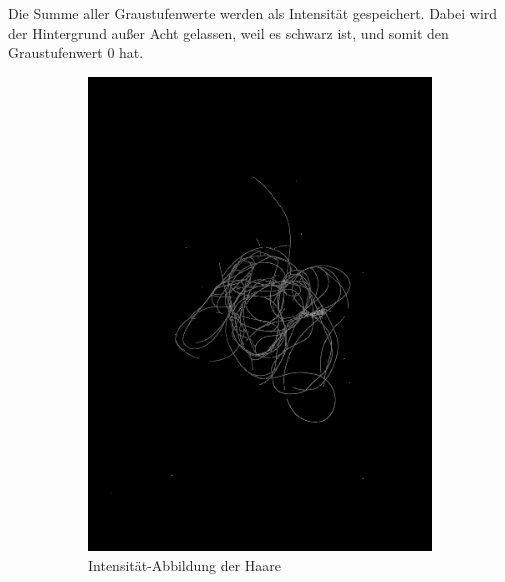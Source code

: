 \documentclass[german,a4paper, 12pt]{llncs}
\begin{document}
Die Summe aller Graustufenwerte werden als Intensität gespeichert. Dabei wird der Hintergrund außer Acht gelassen, weil es schwarz ist, und somit den Graustufenwert 0 hat.
\begin{figure}
	\centering
	\begin{subfigure}[b]{0.475\textwidth}
		\centering
		\includegraphics[width=\textwidth]{fig64/05intenstiy.png}
		\caption[]{Intensität-Abbildung der Haare}
		\label{img:Intensity2}
	\end{subfigure}
	\hfill
	\begin{subfigure}[b]{0.475\textwidth} 
		\centering

\end{subfigure}
\end{figure}
\end{document}
